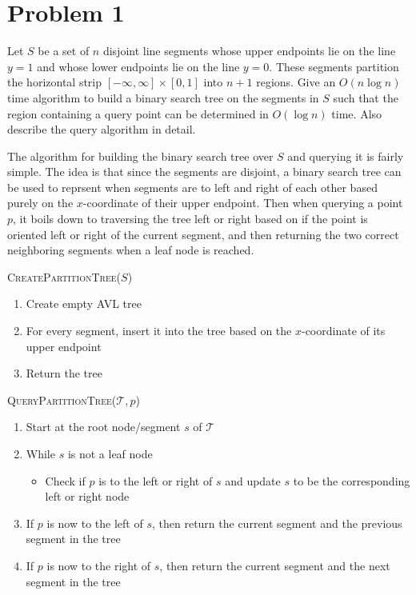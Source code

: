 \documentclass[12pt]{extarticle}
\begin{document}
\section*{Problem 1}
Let $S$ be a set of $n$ disjoint line segments whose upper endpoints lie on the line $y = 1$ and whose lower endpoints lie on the line $y = 0$. These segments partition the horizontal strip $[-\infty, \infty] \times [0,1]$ into $n+1$ regions. Give an $O(n \log n)$ time algorithm to build a binary search tree on the segments in $S$ such that the region containing a query point can be determined in $O(\log n)$ time. Also describe the query algorithm in detail.

\begin{solution}
    The algorithm for building the binary search tree over $S$ and querying it is fairly simple. The idea is that since the segments are disjoint, a binary search tree can be used to reprsent when segments are to left and right of each other based purely on the $x$-coordinate of their upper endpoint. Then when querying a point $p$, it boils down to traversing the tree left or right based on if the point is oriented left or right of the current segment, and then returning the two correct neighboring segments when a leaf node is reached.

    \begin{algorithm}[H]
        \caption{\textsc{CreatePartitionTree}($S$)}
        \begin{enumerate}
            \item Create empty AVL tree
            \item For every segment, insert it into the tree based on the $x$-coordinate of its upper endpoint
            \item Return the tree
        \end{enumerate}
    \end{algorithm}

    \begin{algorithm}[H]
        \caption{\textsc{QueryPartitionTree}($\mathcal{T}, p$)}
        \begin{enumerate}
            \item Start at the root node/segment $s$ of $\mathcal{T}$
            \item While $s$ is not a leaf node
            \begin{itemize}
                \item Check if $p$ is to the left or right of $s$ and update $s$ to be the corresponding left or right node
            \end{itemize}
            \item If $p$ is now to the left of $s$, then return the current segment and the previous segment in the tree
            \item If $p$ is now to the right of $s$, then return the current segment and the next segment in the tree
        \end{enumerate}
    \end{algorithm}


\end{solution}
\end{document}
